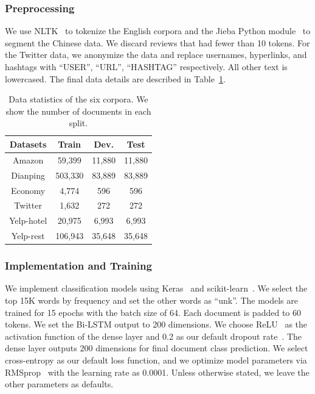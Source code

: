 \subsubsection{Preprocessing}
We use NLTK~\cite{bird2004nltk} to tokenize the English corpora and the Jieba Python module~\cite{sun2012jieba} to segment the Chinese data. We discard reviews that had fewer than 10 tokens. For the Twitter data, we anonymize the data and replace usernames, hyperlinks, and hashtags with ``USER'', ``URL'', ``HASHTAG'' respectively. All other text is lowercased.
The final data details are described in Table~\ref{chap3:table:statics}.

\begin{table}[ht]
 \centering
    \begin{tabular}{c|ccc}
    \hline\hline
    Datasets & Train & Dev. & Test\\
    \hline
    Amazon & 59,399 & 11,880 & 11,880 \\
    Dianping & 503,330 & 83,889 & 83,889 \\
    Economy & 4,774 & 596 & 596\\
    Twitter & 1,632 & 272 & 272\\
    Yelp-hotel & 20,975 & 6,993 & 6,993 \\
    Yelp-rest & 106,943 & 35,648 & 35,648 \\
    \hline
    \end{tabular}
    \caption{Data statistics of the six corpora. We show the number of documents in each split.}
    \label{chap3:table:statics}
\end{table}

\subsubsection{Implementation and Training}
We implement classification models using Keras~\cite{chollet2015keras} and scikit-learn~\cite{pedregosa2011scikit}. We select the top 15K words by frequency and set the other words as ``unk''. The models are trained for 15 epochs with the batch size of 64. Each document is padded to 60 tokens. We set the Bi-LSTM output to 200 dimensions. We choose ReLU~\cite{hahnloser2000digital} as the activation function of the dense layer and 0.2 as our default dropout rate~\cite{srivastava2014dropout}. The dense layer outputs 200 dimensions for final document class prediction. We select cross-entropy as our default loss function, and we optimize model parameters via RMSprop~\cite{tieleman2012lecture} with the learning rate as 0.0001. Unless otherwise stated, we leave the other parameters as defaults.

